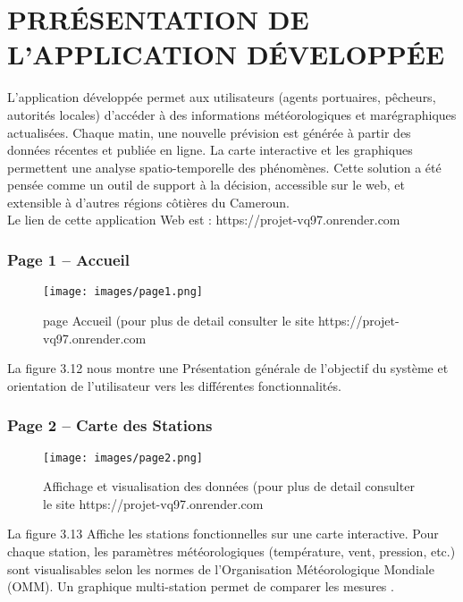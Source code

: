 \documentclass[a4paper,12pt,openany]{report}
\begin{document}
\chapter{PRRÉSENTATION DE L'APPLICATION DÉVELOPPÉE}
\label{ch:résultatsetdiscussion} %
	
	L’application développée permet aux utilisateurs (agents portuaires, pêcheurs, autorités locales) d’accéder à des informations météorologiques et marégraphiques actualisées. Chaque matin, une nouvelle prévision est générée à partir des données récentes et publiée en ligne. La carte interactive et les graphiques permettent une analyse spatio-temporelle des phénomènes.
	Cette solution a été pensée comme un outil de support à la décision, accessible sur le web, et extensible à d’autres régions côtières du Cameroun.\\
	 Le lien de cette application Web est : https://projet-vq97.onrender.com  \\
	 \subsection{Page 1 – Accueil}
	\begin{figure}[H]
	\begin{center}
		\begin{minipage}{\textwidth}
			\begin{center}
				\texttt{[image: images/page1.png]}
			\end{center}
		\end{minipage}
		\caption{page Accueil (pour plus de detail consulter le site https://projet-vq97.onrender.com}
	\end{center}
\end{figure}
La figure  3.12 nous montre une Présentation générale de l’objectif du système et orientation de l’utilisateur vers les différentes fonctionnalités.

	 \subsection{Page 2 – Carte des Stations}
\begin{figure}[H]
	\begin{center}
		\begin{minipage}{\textwidth}
			\begin{center}
				\texttt{[image: images/page2.png]}
			\end{center}
		\end{minipage}
		\caption{Affichage et visualisation des données (pour plus de detail consulter le site https://projet-vq97.onrender.com}
	\end{center}
\end{figure}
La figure  3.13 Affiche les stations fonctionnelles sur une carte interactive. Pour chaque station, les paramètres météorologiques (température, vent, pression, etc.) sont visualisables selon les normes de l’Organisation Météorologique Mondiale (OMM). Un graphique multi-station permet de comparer les mesures .
\end{document}
